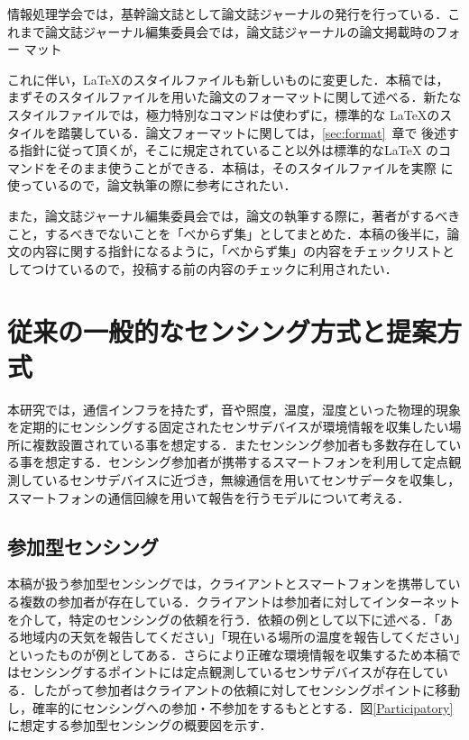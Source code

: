\documentclass[submit,techrep]{ipsj}
\begin{document}
情報処理学会では，基幹論文誌として論文誌ジャーナルの発行を行っている．こ
れまで論文誌ジャーナル編集委員会では，論文誌ジャーナルの論文掲載時のフォー
マット


これに伴い，\LaTeX のスタイルファイルも新しいものに変更した．本稿では，
まずそのスタイルファイルを用いた論文のフォーマットに関して述べる．新たな
スタイルファイルでは，極力特別なコマンドは使わずに，標準的な \LaTeX のス
タイルを踏襲している．論文フォーマットに関しては，\ref{sec:format}~章で
後述する指針に従って頂くが，そこに規定されていること以外は標準的な\LaTeX
のコマンドをそのまま使うことができる．本稿は，そのスタイルファイルを実際
に使っているので，論文執筆の際に参考にされたい．



また，論文誌ジャーナル編集委員会では，論文の執筆する際に，著者がするべき
こと，するべきでないことを「べからず集」としてまとめた．本稿の後半に，論
文の内容に関する指針になるように，「べからず集」の内容をチェックリストと
してつけているので，投稿する前の内容のチェックに利用されたい．

\section{従来の一般的なセンシング方式と提案方式}
本研究では，通信インフラを持たず，音や照度，温度，湿度といった物理的現象を定期的にセンシングする固定されたセンサデバイスが環境情報を収集したい場所に複数設置されている事を想定する．またセンシング参加者も多数存在している事を想定する．センシング参加者が携帯するスマートフォンを利用して定点観測しているセンサデバイスに近づき，無線通信を用いてセンサデータを収集し，スマートフォンの通信回線を用いて報告を行うモデルについて考える．

\subsection{参加型センシング}
本稿が扱う参加型センシングでは，クライアントとスマートフォンを携帯している複数の参加者が存在している．クライアントは参加者に対してインターネットを介して，特定のセンシングの依頼を行う．依頼の例として以下に述べる．「ある地域内の天気を報告してください」「現在いる場所の温度を報告してください」といったものが例としてある．さらにより正確な環境情報を収集するため本稿ではセンシングするポイントには定点観測しているセンサデバイスが存在している．したがって参加者はクライアントの依頼に対してセンシングポイントに移動し，確率的にセンシングへの参加・不参加をするもととする．図\ref{Participatory}に想定する参加型センシングの概要図を示す．
\end{document}
